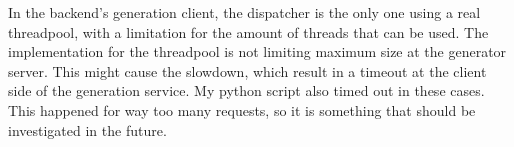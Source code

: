 			In the backend's generation client, the dispatcher is the only one using a real threadpool, with a 
			limitation for the amount of threads that can be used. 
			The implementation for the threadpool is not limiting
			maximum size at the generator server. This might cause the slowdown, which result in a timeout at the client side of the generation service.
			My python script also timed out in these cases. This happened for way too many 
			requests, so it is something that should be investigated in the future.